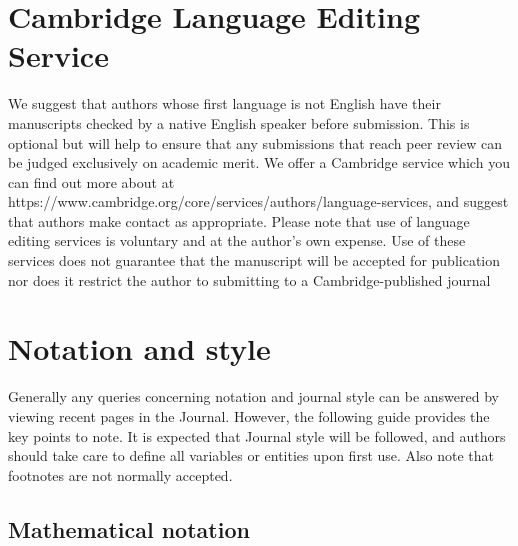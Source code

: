 \documentclass{jfm}
\begin{document}
\section{Cambridge Language Editing Service} 
We suggest that authors whose first language is not English have their manuscripts checked by a native English speaker before submission. This is optional but will help to ensure that any submissions that reach peer review can be judged exclusively on academic merit. We offer a Cambridge service which you can find out more about at https://www.cambridge.org/core/services/authors/language-services, and suggest that authors make contact as appropriate. Please note that use of language editing services is voluntary and at the author’s own expense. Use of these services does not guarantee that the manuscript will be accepted for publication nor does it restrict the author to submitting to a Cambridge-published journal


\section{Notation and style}\label{notstyle}
Generally any queries concerning notation and journal style can be answered by viewing recent pages in the Journal. However, the following guide provides the key points to note. It is expected that Journal style will be followed, and authors should take care to define all variables or entities upon first use. Also note that footnotes are not normally accepted.

\subsection{Mathematical notation}
\end{document}
